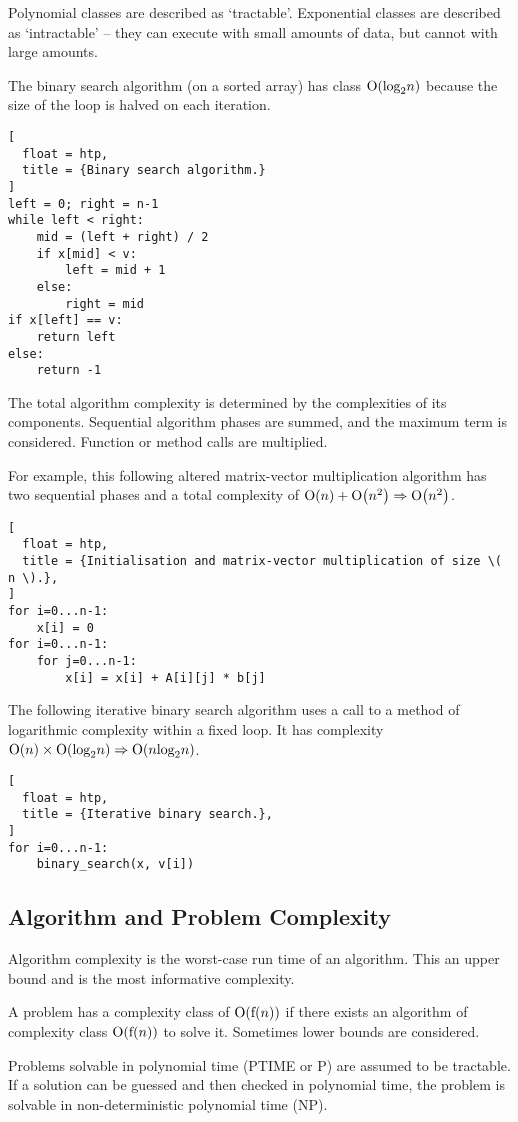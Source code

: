 Polynomial classes are described as `tractable'.
Exponential classes are described as `intractable' -- they can execute with small amounts of data, but cannot with large amounts.

The binary search algorithm (on a sorted array) has class \( \textup{O}\!\left( \textup{log}_2 n \right) \) because the size of the loop is halved on each iteration.

\begin{lstlisting}[
  float = htp,
  title = {Binary search algorithm.}
]
left = 0; right = n-1
while left < right:
    mid = (left + right) / 2
    if x[mid] < v:
        left = mid + 1
    else:
        right = mid
if x[left] == v:
    return left
else:
    return -1
\end{lstlisting}

The total algorithm complexity is determined by the complexities of its components.
Sequential algorithm phases are summed, and the maximum term is considered.
Function or method calls are multiplied.

For example, this following altered matrix-vector multiplication algorithm has two sequential phases and a total complexity of \( \textup{O}\!\left( n \right) + \textup{O}\!\left( n^2 \right) \Rightarrow \textup{O}\!\left( n^2 \right) \).

\begin{lstlisting}[
  float = htp,
  title = {Initialisation and matrix-vector multiplication of size \( n \).},
]
for i=0...n-1:
    x[i] = 0
for i=0...n-1:
    for j=0...n-1:
        x[i] = x[i] + A[i][j] * b[j]
\end{lstlisting}

The following iterative binary search algorithm uses a call to a method of logarithmic complexity within a fixed loop.
It has complexity \( \textup{O}\!\left( n \right) \times \textup{O}\!\left( \textup{log}_2 n \right) \Rightarrow \textup{O}\!\left( n \textup{log}_2 n \right) \).

\begin{lstlisting}[
  float = htp,
  title = {Iterative binary search.},
]
for i=0...n-1:
    binary_search(x, v[i])
\end{lstlisting}

\subsection{Algorithm and Problem Complexity}

Algorithm complexity is the worst-case run time of an algorithm.
This an upper bound and is the most informative complexity.

A problem has a complexity class of \( \textup{O}\!\left( \textup{f}\!\left( n \right) \right) \) if there exists an algorithm of complexity class \( \textup{O}\!\left( \textup{f}\!\left( n \right) \right) \) to solve it.
Sometimes lower bounds are considered.

Problems solvable in polynomial time (PTIME or P) are assumed to be tractable.
If a solution can be guessed and then checked in polynomial time, the problem is solvable in non-deterministic polynomial time (NP).
